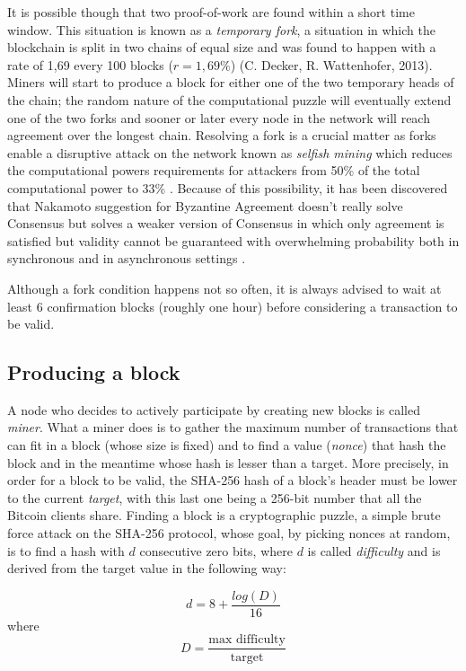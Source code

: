 		It is possible though that two proof-of-work are found within a short time window. This situation is known as a \textit{temporary fork}, a situation in which the blockchain is split in two chains of equal size and was found to happen with a rate of 1,69 every 100 blocks (\(r = 1,69\%\)) (C. Decker, R. Wattenhofer, 2013). Miners will start to produce a block for either one of the two temporary heads of the chain; the random nature of the computational puzzle will eventually extend one of the two forks and sooner or later every node in the network will reach agreement over the longest chain. Resolving a fork is a crucial matter as forks enable a disruptive attack on the network known as \textit{selfish mining} which reduces the computational powers requirements for attackers from 50\% of the total computational power to 33\% \cite{Eyal2013}. Because of this possibility, it has been discovered that Nakamoto suggestion for Byzantine Agreement doesn’t really solve Consensus but solves a weaker version of Consensus in which only agreement is satisfied but validity cannot be guaranteed with overwhelming probability both in synchronous \cite{Garay2015} and in asynchronous settings \cite{Pass2016}.
		
		Although a fork condition happens not so often, it is always advised to wait at least 6 confirmation blocks (roughly one hour) before considering a transaction to be valid.
		
		\subsection{Producing a block}
		
		A node who decides to actively participate by creating new blocks is called \textit{miner}. What a miner does is to gather the maximum number of transactions that can fit in a block (whose size is fixed) and to find a value (\textit{nonce}) that hash the block and in the meantime whose hash is lesser than a target. More precisely, in order for a block to be valid, the SHA-256 hash of a block's header must be lower to the current \textit{target}, with this last one being a 256-bit number that all the Bitcoin clients share. Finding a block is a cryptographic puzzle, a simple brute force attack on the SHA-256 protocol, whose goal, by picking nonces at random, is to find a hash with \(d\) consecutive zero bits, where \(d\) is called \textit{difficulty} and is derived from the target value in the following way:
		
		\[ d = 8 + \frac{log(D)}{16}\] 
		where
		\[D = \frac{\text{max difficulty}}{\text{target}}\]
		
